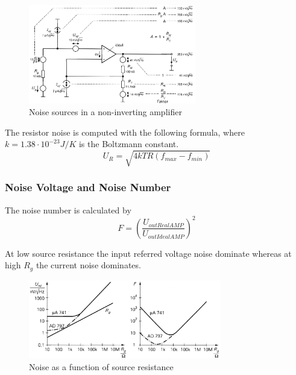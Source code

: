 			\begin{figure}[h]
				\centering
				\includegraphics[width=0.65\textwidth]{images/NoiseSources.png}
				\caption{Noise sources in a non-inverting amplifier}
				\label{Fig:NoiseSources}
			\end{figure}
			The resistor noise is computed with the following formula, where $k = 1.38 \cdot 10^{-23} J/K$ is the Boltzmann constant. 
			\begin{equation}
				U_R = \sqrt{4kTR\left(f_{max}-f_{min}\right)}
			\end{equation}
		\subsubsection{Noise Voltage and Noise Number}
			The noise number is calculated by
			\begin{equation}
				F = \left(\frac{U_{outRealAMP}}{U_{outIdealAMP}}\right)^2
			\end{equation}	
			
			At low source resistance the input referred voltage noise dominate whereas at high $R_g$ the current noise dominates. 
			\begin{figure}[h]
				\centering
				\includegraphics[width=0.75\textwidth]{images/NoiseSourceResistance.png}
				\caption{Noise as a function of source resistance}
				\label{Fig:NoiseSourceResistance}
			\end{figure}
			
